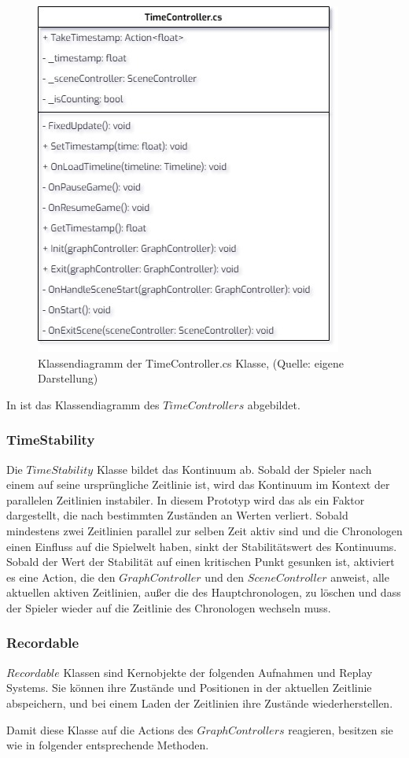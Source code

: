 \begin{figure}[ht]
\centering
\includegraphics[width=0.4\linewidth]{content/pictures/TimeController.jpg}
\caption{Klassendiagramm der TimeController.cs Klasse, (Quelle: eigene Darstellung)}
\label{fig:timeController-cs}
\end{figure}

In  ist das Klassendiagramm des $TimeControllers$ abgebildet.

\subsubsection{TimeStability}
Die $TimeStability$ Klasse bildet das Kontinuum ab. Sobald der Spieler nach einem  auf seine ursprüngliche Zeitlinie  ist, wird das Kontinuum im Kontext der parallelen Zeitlinien instabiler. In diesem Prototyp wird das als ein Faktor dargestellt, die nach bestimmten Zuständen an Werten verliert. Sobald mindestens zwei Zeitlinien parallel zur selben Zeit aktiv sind und die Chronologen einen Einfluss auf die Spielwelt haben, sinkt der Stabilitätswert des Kontinuums. Sobald der Wert der Stabilität auf einen kritischen Punkt gesunken ist, aktiviert es eine Action, die den $GraphController$ und den $SceneController$ anweist, alle aktuellen aktiven Zeitlinien, außer die des Hauptchronologen, zu löschen und dass der Spieler wieder auf die Zeitlinie des Chronologen wechseln muss.
\subsubsection{Recordable}
$Recordable$ Klassen sind Kernobjekte der folgenden Aufnahmen und Replay Systems. Sie können ihre Zustände und Positionen in der aktuellen Zeitlinie abspeichern, und bei einem Laden der Zeitlinien ihre Zustände wiederherstellen.

Damit diese Klasse auf die Actions des $GraphControllers$ reagieren, besitzen sie wie in folgender  entsprechende Methoden.

